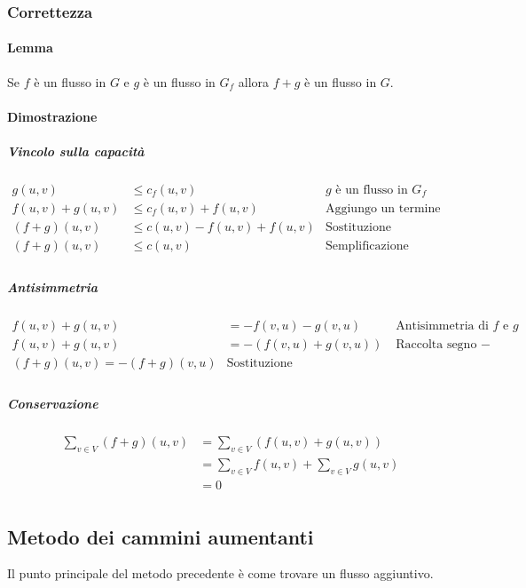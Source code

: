 \subsubsection{Correttezza}
\paragraph{Lemma}
Se $f$ \`e un flusso in $G$ e $g$ \`e un flusso in $G_f$ allora $f+g$ \`e un flusso in $G$.
\paragraph{Dimostrazione}
\subparagraph{Vincolo sulla capacit\`a}
\begin{align*}
	g(u, v) & \le c_f(u, v) \quad\quad & \text{$g$ \`e un flusso in $G_f$}\\
	f(u, v) + g(u, v) & \le c_f(u, v) + f(u, v) & \text{Aggiungo un termine uguale}\\
	(f+g)(u, v) & \le c(u, v) - f(u, v) + f(u, v) & \text{Sostituzione}\\
	(f+g)(u, v) & \le c(u, v) & \text{Semplificazione}\\
\end{align*}
\subparagraph{Antisimmetria}
\begin{align*}
	f(u, v) + g(u, v) & = -f(v, u) - g(v, u) \quad\quad & \text{Antisimmetria di $f$ e $g$}\\
	f(u, v) + g(u, v) & = -(f(v, u) + g(v, u)) & \text{Raccolta segno $-$}\\
	(f+g)(u, v) = -(f+g)(v, u) & \text{Sostituzione}\\
\end{align*}
\subparagraph{Conservazione}
\begin{align*}
	\sum\limits_{v\in V} (f+g)(u, v) & = \sum\limits_{v\in V}(f(u, v) + g(u, v))\\
					 & = \sum\limits_{v\in V} f(u, v) + \sum\limits_{v\in V} g(u, v)\\
					 & = 0\\
\end{align*}
\subsection{Metodo dei cammini aumentanti}
Il punto principale del metodo precedente \`e come trovare un flusso aggiuntivo.
